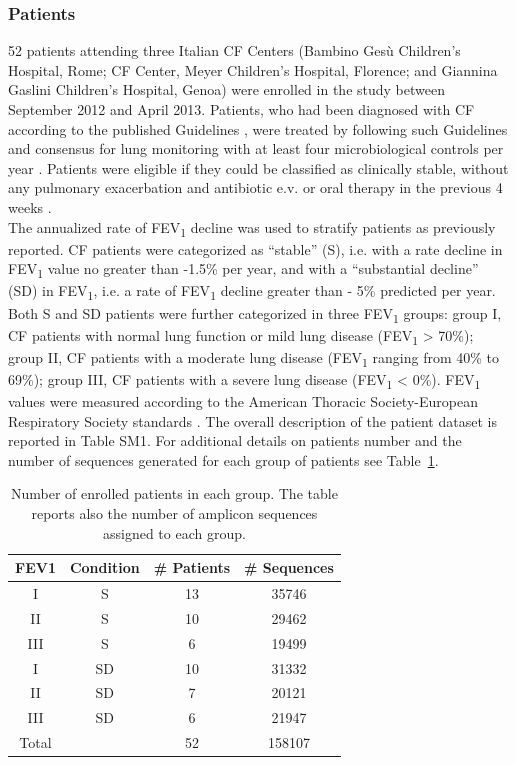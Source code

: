 \subsubsection{Patients}
52 patients attending three Italian CF Centers (Bambino Ges\`u Children's Hospital, Rome; CF Center, Meyer Children's Hospital, Florence; and Giannina Gaslini Children's Hospital, Genoa) were enrolled in the study between September 2012 and April 2013. Patients, who had been diagnosed with CF according to the published Guidelines \cite{farrell2008guidelines}, were treated by following such Guidelines and consensus for lung monitoring with at least four microbiological controls per year \cite{flume2009cystic}. Patients were eligible if they could be classified as clinically stable, without any pulmonary exacerbation and antibiotic e.v. or oral therapy in the previous 4 weeks \cite{fuchs1994effect, ramsey1999intermittent}.\\
The annualized rate of FEV\textsubscript{1} decline was used to stratify patients as previously reported. CF patients were categorized as ``stable'' (S), i.e. with a rate decline in FEV\textsubscript{1} value no greater than -1.5\% per year, and with a ``substantial decline'' (SD) in FEV\textsubscript{1}, i.e. a rate of FEV\textsubscript{1} decline greater than - 5\% predicted per year. Both S and SD patients were further categorized in three FEV\textsubscript{1} groups: group I, CF patients with normal lung function or mild lung disease (FEV\textsubscript{1} {\textgreater} 70\%); group II, CF patients with a moderate lung disease (FEV\textsubscript{1} ranging from 40\% to 69\%); group III, CF patients with a severe lung disease (FEV\textsubscript{1} {\textless} 0\%). FEV\textsubscript{1} values were measured according to the American Thoracic Society-European Respiratory Society standards \cite{miller2005standardisation}. The overall description of the patient dataset is reported in Table SM1. For additional details on patients number and the number of sequences generated for each group of patients see Table~\ref{tab:ffc116s}.\\
\begin{table}
\centering
\scriptsize
\begin{tabular}{c c c c}
\hline
FEV1 & Condition & \# Patients & \# Sequences \\
\hline\hline
I & S & 13 & 35746 \\
II & S & 10 & 29462 \\
III & S & 6 & 19499 \\
I & SD & 10 & 31332 \\
II & SD & 7 & 20121 \\
III & SD & 6 & 21947 \\
Total &  & 52 & 158107\\
\hline
\end{tabular}
\caption{\label{tab:ffc116s}Number of enrolled patients in each group. The table reports also the number of amplicon sequences assigned to each group.} 
\end{table}

